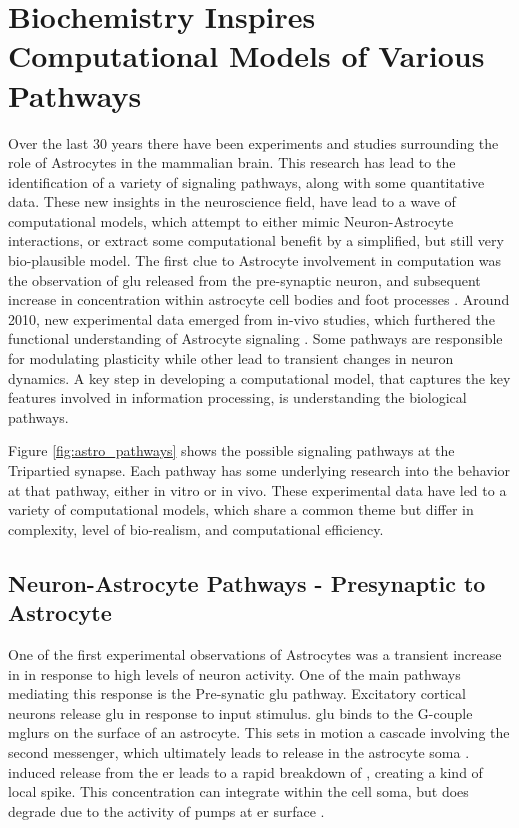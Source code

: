 
    \section{Biochemistry Inspires Computational Models of Various Pathways}
    Over the last 30 years there have been experiments and studies surrounding the
    role of Astrocytes in the mammalian brain. This research has lead to the
    identification of a variety of signaling pathways, along with some
    quantitative data. These new insights in the neuroscience field, have lead
    to a wave of computational models, which attempt to either mimic
    Neuron-Astrocyte interactions, or extract some computational benefit by a
    simplified, but still very bio-plausible model. The first clue to Astrocyte
    involvement in computation was the observation of \Gls{glu} released from
    the pre-synaptic neuron, and subsequent increase in \ca concentration
    within astrocyte cell bodies and foot processes \cite{manninen_2018}. Around
    2010, new experimental data emerged from in-vivo studies, which furthered
    the functional understanding of Astrocyte signaling
    \cite{manninen_2018}. Some pathways are responsible for modulating
    plasticity while other lead to transient changes in neuron dynamics. A key
    step in developing a computational model, that captures the key features
    involved in information processing, is understanding the biological
    pathways.


    Figure \ref{fig:astro_pathways} shows the possible signaling pathways at the
    Tripartied synapse. Each pathway has some underlying research into the
    behavior at that pathway, either in vitro or in vivo. These experimental data
    have led to a variety of computational models, which share a common theme but
    differ in complexity, level of bio-realism, and computational efficiency.

    \subsection{Neuron-Astrocyte Pathways - Presynaptic to Astrocyte}

    One of the first experimental observations of Astrocytes was a transient
    increase in \ca in response to high levels of neuron activity. One of the
    main pathways mediating this response is the Pre-synatic \Gls{glu}
    pathway. Excitatory cortical neurons release \Gls{glu} in response to input
    stimulus. \Gls{glu} binds to the G-couple \Glspl{mglur} on the surface
    of an astrocyte. This sets in motion a cascade involving the \ipt second
    messenger, which ultimately leads to \ca release in the astrocyte soma
    \cite{pitta_2012}. \ipt induced \ca release from the \Gls{er} leads to a rapid
    breakdown of \ipt, creating a kind of local \ca spike. This \ca
    concentration can integrate within the cell soma, but does degrade due to
    the activity of pumps at \Gls{er} surface \cite{pitta_2012}.

